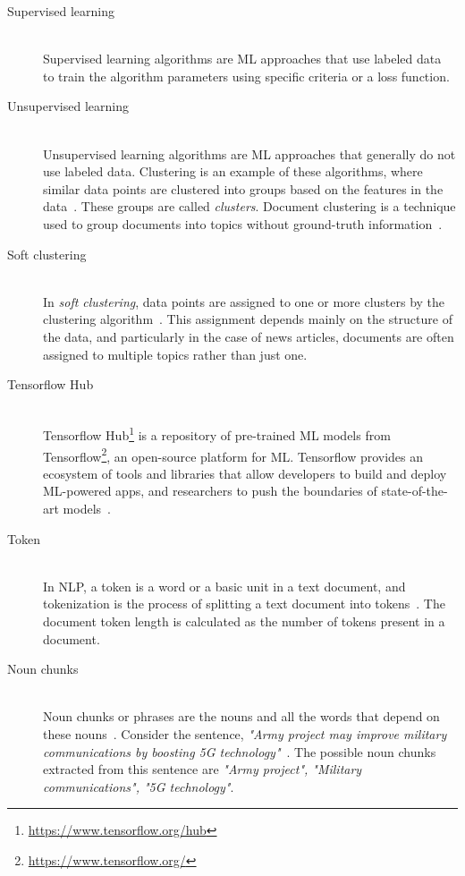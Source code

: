 \begin{description}
	\item[Supervised learning] \hfill \\ Supervised learning algorithms are \ac{ML} approaches that use labeled data~\cite{9155761} to train the algorithm parameters using specific criteria or a loss function.
	
	\item[Unsupervised learning] \hfill \\ Unsupervised learning algorithms are \ac{ML} approaches that generally do not use labeled data. Clustering is an example of these algorithms, where similar data points are clustered into groups based on the features in the data~\cite{mahesh2020machine}. These groups are called \textit{clusters}. Document clustering is a technique used to group documents into topics without ground-truth information~\cite{de2012document}.
	
	\item[Soft clustering] \hfill \\ In \textit{soft clustering}, data points are assigned to one or more clusters by the clustering algorithm~\cite{de2012document}. This assignment depends mainly on the structure of the data, and particularly in the case of news articles, documents are often assigned to multiple topics rather than just one.
	
	 \item[Tensorflow Hub] \hfill \\ Tensorflow Hub\footnote{\url{https://www.tensorflow.org/hub}} is a repository of pre-trained ML models from Tensorflow\footnote{\url{https://www.tensorflow.org/}}, an open-source platform for ML. Tensorflow provides an ecosystem of tools and libraries that allow developers to build and deploy ML-powered apps, and researchers to push the boundaries of state-of-the-art models~\cite{tensorflow_developers_2022_6574269}.
	
	 \item[Token] \hfill \\ In NLP, a token is a word or a basic unit in a text document, and tokenization is the process of splitting a text document into tokens~\cite{webster1992tokenization}. The document token length is calculated as the number of tokens present in a document.
	
	\item[Noun chunks] \hfill \\ Noun chunks or phrases are the nouns and all the words that depend on these nouns~\cite{noun_chunk}. Consider the sentence, \textit{"Army project may improve military communications by boosting 5G technology"}~\cite{sample_news_article}. The possible noun chunks extracted from this sentence are \textit{"Army project", "Military communications", "5G technology"}.
	

\end{description}
